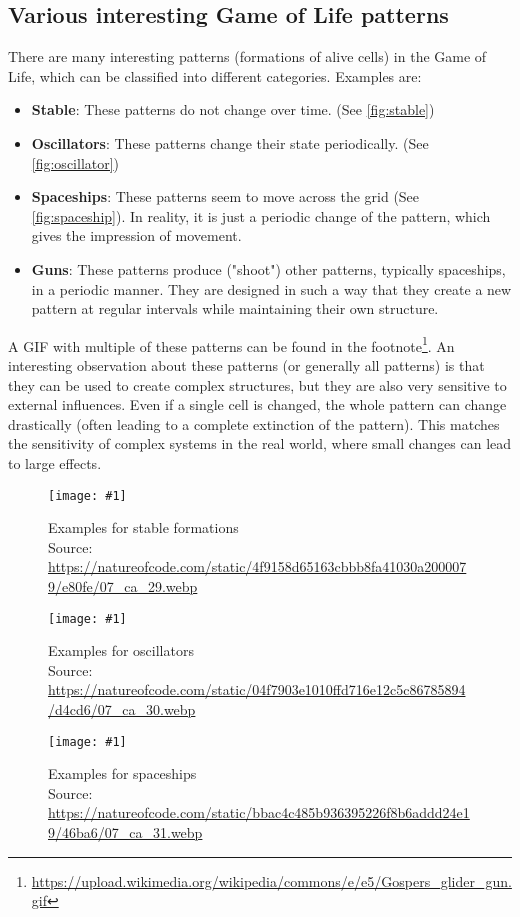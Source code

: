 \documentclass[a4paper,12pt]{llncs}
\numberwithin{equation}{section}
\newcommand{\imagewithwidth}[5]{
  \begin{figure}[htbp]%
    \begin{center}%
      \texttt{[image: \#1]}%
      \caption[#5]{#4}%
      \label{#3}%
    \end{center}%
  \end{figure}
}
\begin{document}
\subsection{Various interesting Game of Life patterns}
There are many interesting patterns (formations of alive cells) in the Game of Life, which can be classified into different categories. Examples are:
\begin{itemize}
  \item \textbf{Stable}: These patterns do not change over time. (See \autoref{fig:stable})
  \item \textbf{Oscillators}: These patterns change their state periodically. (See \autoref{fig:oscillator})
  \item \textbf{Spaceships}: These patterns seem to move across the grid (See \autoref{fig:spaceship}). In reality, it is just a periodic change of the pattern, which gives the impression of movement.
  \item \textbf{Guns}: These patterns produce ("shoot") other patterns, typically spaceships, in a periodic manner. They are designed in such a way that they create a new pattern at regular intervals while maintaining their own structure.
\end{itemize}
A GIF with multiple of these patterns can be found in the footnote\footnote{\url{https://upload.wikimedia.org/wikipedia/commons/e/e5/Gospers_glider_gun.gif}}.
An interesting observation about these patterns (or generally all patterns) is that they can be used to create complex structures,
but they are also very sensitive to external influences. Even if a single cell is changed, the whole pattern can change drastically (often leading to a complete extinction of the pattern).
This matches the sensitivity of complex systems in the real world, where small changes can lead to large effects.
\imagewithwidth{figures/stable}{0.5\textwidth}{fig:stable}{Examples for stable formations\\Source: \url{https://natureofcode.com/static/4f9158d65163cbbb8fa41030a2000079/e80fe/07_ca_29.webp}}{}
\imagewithwidth{figures/oscillator}{0.5\textwidth}{fig:oscillator}{Examples for oscillators\\Source: \url{https://natureofcode.com/static/04f7903e1010ffd716e12c5c86785894/d4cd6/07_ca_30.webp}}{}
\imagewithwidth{figures/spaceship}{0.5\textwidth}{fig:spaceship}{Examples for spaceships\\Source: \url{https://natureofcode.com/static/bbac4c485b936395226f8b6addd24e19/46ba6/07_ca_31.webp}}{}
\end{document}
